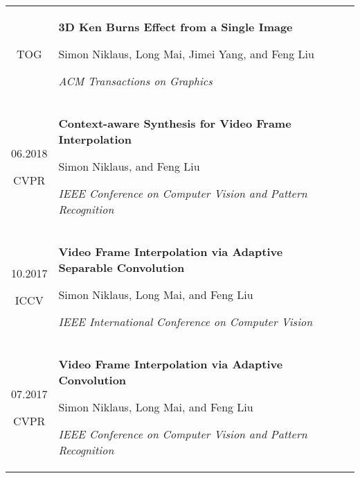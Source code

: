\documentclass[10pt]{article}
\begin{document}
\begin{tabular}{C Z D}
{		\vspace{-0.05cm}
		
		{\scriptsize TOG}
	}
	&
	{
		{\bf 3D Ken Burns Effect from a Single Image}
		
		\vspace{0.00cm}
		
		{\scriptsize Simon Niklaus, Long Mai, Jimei Yang, and Feng Liu}
		
		\vspace{0.05cm}
		
		{\scriptsize \it ACM Transactions on Graphics}
		
		\vspace{0.0cm}
	}
	\\
	{
		06.2018
		
		\vspace{-0.05cm}
		
		{\scriptsize CVPR}
	}
	&
	{
		{\bf Context-aware Synthesis for Video Frame Interpolation}
		
		\vspace{0.00cm}
		
		{\scriptsize Simon Niklaus, and Feng Liu}
		
		\vspace{0.05cm}
		
		{\scriptsize \it IEEE Conference on Computer Vision and Pattern Recognition}
		
		\vspace{0.0cm}
	}
	\\
	{
		10.2017
		
		\vspace{-0.05cm}
		
		{\scriptsize ICCV}
	}
	&
	{
		{\bf Video Frame Interpolation via Adaptive Separable Convolution}
		
		\vspace{0.00cm}
		
		{\scriptsize Simon Niklaus, Long Mai, and Feng Liu}
		
		\vspace{0.05cm}
		
		{\scriptsize \it IEEE International Conference on Computer Vision}
		
		\vspace{0.0cm}
	}
	\\
	{
		07.2017
		
		\vspace{-0.05cm}
		
		{\scriptsize CVPR}
	}
	&
	{
		{\bf Video Frame Interpolation via Adaptive Convolution}
		
		\vspace{0.00cm}
		
		{\scriptsize Simon Niklaus, Long Mai, and Feng Liu}
		
		\vspace{0.05cm}
		
		{\scriptsize \it IEEE Conference on Computer Vision and Pattern Recognition}
	}
	\\
\end{tabular}
\end{document}
